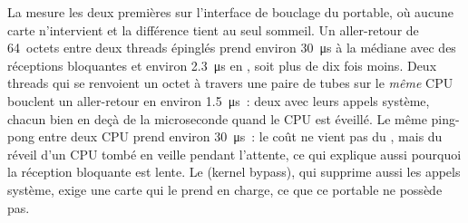 La  mesure les deux premières sur l'interface de bouclage du portable, où aucune carte n'intervient et la
différence tient au seul sommeil. Un aller-retour de 64~octets entre deux threads épinglés prend environ \qty{30}{\micro\second} à la
médiane avec des réceptions bloquantes et environ \qty{2.3}{\micro\second} en , soit plus de dix fois moins. Deux threads qui se renvoient un octet
à travers une paire de tubes sur le \emph{même} CPU bouclent un aller-retour en environ \qty{1.5}{\micro\second}~: deux 
avec leurs appels système, chacun bien en deçà de la microseconde quand le CPU est éveillé. Le même ping-pong entre deux CPU prend environ
\qty{30}{\micro\second}~: le coût ne vient pas du , mais du réveil d'un CPU tombé en veille pendant l'attente, ce qui explique aussi pourquoi la
réception bloquante est lente. Le  (kernel bypass), qui supprime aussi les appels système, exige une carte qui le prend en charge, ce que ce
portable ne possède pas.

